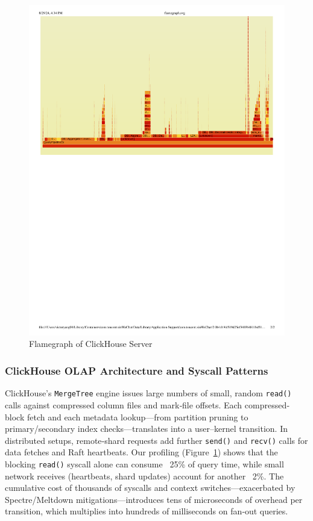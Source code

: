 \documentclass[sigconf,10pt]{acmart}
\begin{document}
\begin{figure}
\centering
\includegraphics[width=\columnwidth]{img/flamegraph.pdf}
\caption{Flamegraph of ClickHouse Server}\label{fig:profiling}
\end{figure}
\subsubsection{ClickHouse OLAP Architecture and Syscall Patterns}  
ClickHouse’s \texttt{MergeTree} engine issues large numbers of small, random \texttt{read()} calls against compressed column files and mark‐file offsets.  Each compressed‐block fetch and each metadata lookup—from partition pruning to primary/secondary index checks—translates into a user–kernel transition.  In distributed setups, remote‐shard requests add further \texttt{send()} and \texttt{recv()} calls for data fetches and Raft heartbeats.  Our profiling (Figure~\ref{fig:profiling}) shows that the blocking \texttt{read()} syscall alone can consume ~25\% of query time, while small network receives (heartbeats, shard updates) account for another ~2\%.  The cumulative cost of thousands of syscalls and context switches—exacerbated by Spectre/Meltdown mitigations—introduces tens of microseconds of overhead per transition, which multiplies into hundreds of milliseconds on fan‐out queries.
\end{document}
